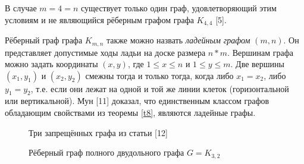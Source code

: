 \documentclass[12pt]{article}
\begin{document}
В случае $m=4=n$ существует только один граф, удовлетворяющий этим условиям и не являющийся рёберным графом графа $K_{4,4}$ [5].

Рёберный граф графа $K_{m,n}$ также можно назвать {\it ладейным графом} $(m,n)$. Он представляет допустимые ходы ладьи на доске размера $n * m$.  Вершинам графа можно задать координаты $(x,y)$,  где $1 \leq x \leq n$ и $1 \leq y \leq m$.
Две вершины $(x_1,y_1)$ и $(x_2,y_2)$ смежны тогда и только тогда, когда либо $x_1 = x_2$, либо $y_1 = y_2$, т.е. если они лежат на одной и той же линии клеток (горизонтальной или вертикальной). Мун [11] доказал, что единственным классом графов обладающим свойствами из теоремы \ref{t8}, являются ладейные графы.


\begin{figure}
	\label{pic13.0}
	\caption{Три запрещённых графа из статьи [12]}
\end{figure}

\begin{figure}
	\label{pic13}
	\caption{Рёберный граф полного двудольного графа $G = K_{3,2}$}
\end{figure}
\end{document}
